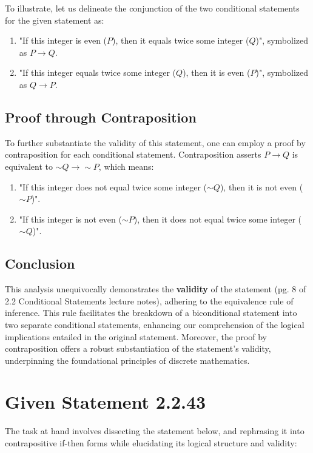 \documentclass[12pt]{article}
\begin{document}
To illustrate, let us delineate the conjunction of the two conditional statements for the given statement as:
\begin{enumerate}
    \item "If this integer is even (\( P \)), then it equals twice some integer (\( Q \))", symbolized as \( P \rightarrow Q \).
    \item "If this integer equals twice some integer (\( Q \)), then it is even (\( P \))", symbolized as \( Q \rightarrow P \).
\end{enumerate}

\subsection*{Proof through Contraposition}
To further substantiate the validity of this statement, one can employ a proof by contraposition for each conditional statement. Contraposition asserts \( P \rightarrow Q \) is equivalent to \( \sim Q \rightarrow \sim P \), which means:
\begin{enumerate}
    \item "If this integer does not equal twice some integer (\( \sim Q \)), then it is not even (\( \sim P \))".
    \item "If this integer is not even (\( \sim P \)), then it does not equal twice some integer (\( \sim Q \))".
\end{enumerate}

\subsection*{Conclusion}
This analysis unequivocally demonstrates the {\bf{validity}} of the statement (pg. 8 of 2.2 Conditional Statements lecture notes), adhering to the equivalence rule of inference. This rule facilitates the breakdown of a biconditional statement into two separate conditional statements, enhancing our comprehension of the logical implications entailed in the original statement. Moreover, the proof by contraposition offers a robust substantiation of the statement's validity, underpinning the foundational principles of discrete mathematics.

\section*{Given Statement 2.2.43}
The task at hand involves dissecting the statement below, and rephrasing it into contrapositive if-then forms while elucidating its logical structure and validity:
\end{document}
